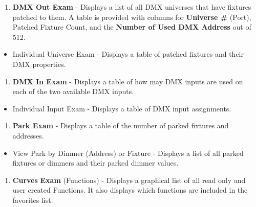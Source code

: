 \documentclass[
]{article}
\providecommand{\tightlist}{%
  \setlength{\itemsep}{0pt}\setlength{\parskip}{0pt}}
\begin{document}
\begin{enumerate}
\def\labelenumi{\arabic{enumi}.}
\setcounter{enumi}{2}
\tightlist
\item
  \textbf{DMX Out Exam} - Displays a list of all DMX universes that have fixtures patched to them. A table is provided with columns for \textbf{Universe \#} {(Port)}, Patched Fixture Count, and the \textbf{Number of Used DMX Address} out of 512.
\end{enumerate}

\begin{itemize}
\tightlist
\item
  Individual Universe Exam - Displays a table of patched fixtures and their DMX properties.
\end{itemize}

\begin{enumerate}
\def\labelenumi{\arabic{enumi}.}
\setcounter{enumi}{3}
\tightlist
\item
  \textbf{DMX In Exam} - Displays a table of how may DMX inputs are used on each of the two available DMX inputs.
\end{enumerate}

\begin{itemize}
\tightlist
\item
  Individual Input Exam - Displays a table of DMX input assignments.
\end{itemize}

\begin{enumerate}
\def\labelenumi{\arabic{enumi}.}
\setcounter{enumi}{4}
\tightlist
\item
  \textbf{Park Exam} - Displays a table of the number of parked fixtures and addresses.
\end{enumerate}

\begin{itemize}
\tightlist
\item
  View Park by Dimmer (Address) or Fixture - Displays a list of all parked fixtures or dimmers and their parked dimmer values.
\end{itemize}

\begin{enumerate}
\def\labelenumi{\arabic{enumi}.}
\setcounter{enumi}{5}
\tightlist
\item
  {\textbf{Curves}} \textbf{Exam} (Functions) - Displays a graphical list of all read only and user created Functions. It also displays which functions are included in the favorites list.
\end{enumerate}
\end{document}
